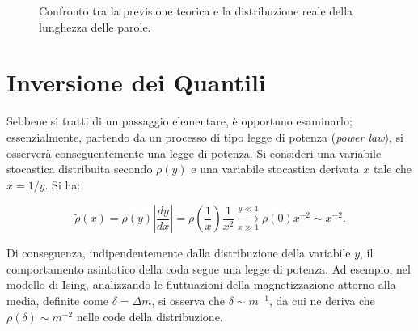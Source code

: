 \begin{figure}[h]
\centering
{}
\caption{Confronto tra la previsione teorica e la distribuzione reale della lunghezza delle parole.}
\end{figure}

\section{Inversione dei Quantili}

Sebbene si tratti di un passaggio elementare, è opportuno esaminarlo; essenzialmente, partendo da un processo di tipo legge di potenza (\textit{power law}), si osserverà conseguentemente una legge di potenza. Si consideri una variabile stocastica distribuita secondo $\rho(y)$ e una variabile stocastica derivata $x$ tale che $x = 1/y$. Si ha:

\begin{equation}
    \tilde{\rho}(x) = \rho(y) \left| \frac{dy}{dx} \right| = \rho\left(\frac{1}{x}\right) \frac{1}{x^2} \xrightarrow[x \gg 1]{y \ll 1} \rho(0) x^{-2} \sim x^{-2}.
    \label{eq:quantile_inversion}
\end{equation}

Di conseguenza, indipendentemente dalla distribuzione della variabile $y$, il comportamento asintotico della coda segue una legge di potenza. Ad esempio, nel modello di Ising, analizzando le fluttuazioni della magnetizzazione attorno alla media, definite come $\delta = \Delta m$, si osserva che $\delta \sim m^{-1}$, da cui ne deriva che $\rho(\delta) \sim m^{-2}$ nelle code della distribuzione.

